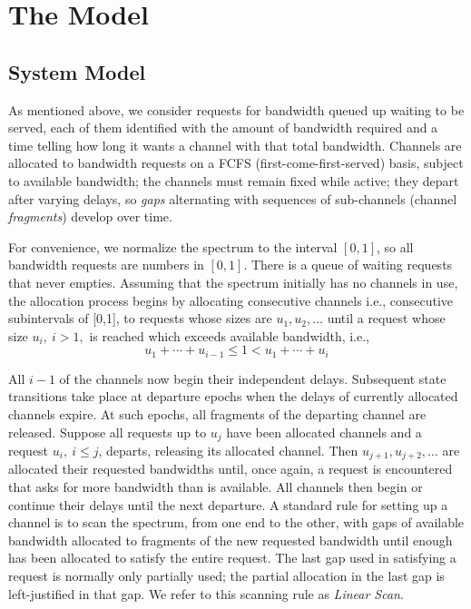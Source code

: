 \documentclass{amsart}
\begin{document}
\section{The Model}\label{sec:model}

\subsection*{System Model}
As  mentioned above, we  consider requests for bandwidth  queued up  waiting to be served, each  of them identified with the amount of  bandwidth required and a  time telling how
long it  wants a channel with that total bandwidth.
Channels are  allocated to bandwidth requests on  a FCFS (first-come-first-served)  basis, subject to
available  bandwidth; the  channels must  remain  fixed while active;  they
depart  after varying  delays,  so \emph{gaps} alternating with sequences of sub-channels (channel \emph{fragments})
develop over time.

For convenience, we  normalize the spectrum to the interval $[0,1]$,  so all bandwidth requests
are numbers in $[0,1]$. There is  a  queue of  waiting requests that never empties.  Assuming that the spectrum initially has no channels in use,    the allocation
process    begins   by   allocating   consecutive    channels   i.e.,   consecutive
subintervals of  [0,1], to  requests whose sizes are $u_1, u_2, \ldots  $ until  a request
whose size $u_i,~i>1,$ is reached which exceeds available bandwidth, i.e.,
 $$   u_1 + \cdots + u_{i-1} \leq 1 < u_1 + \cdots + u_i $$

All $i-1$ of the channels  now begin their independent delays.  Subsequent  state transitions take  place at departure  epochs when the  delays of
currently allocated channels expire. At such  epochs,
all fragments of the departing channel are released.  Suppose all requests up  to $u_j$ have been
allocated  channels and  a request  $u_i,~ i  \leq j$,  departs, releasing  its allocated
channel.   Then $u_{j+1},  u_{j+2}, \ldots  $ are  allocated their  requested bandwidths
until, once again, a  request is encountered that asks for more bandwidth than is available.
All channels then begin  or continue their delays
until the next departure. A standard rule for setting up a channel is to
scan the spectrum, from  one end to the other, with gaps  of available bandwidth allocated
to  fragments of  the  new requested  bandwidth until  enough has  been
allocated to  satisfy the entire  request. The  last gap used  in satisfying a  request is
normally only partially used; the partial  allocation in the last gap is left-justified in
that gap. We refer to this scanning rule as {\em  Linear Scan}.
\end{document}

